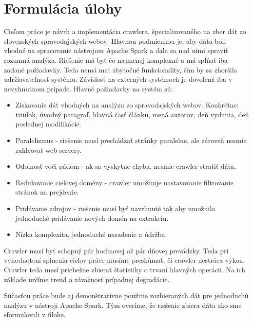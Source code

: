 \chapter*{Formulácia úlohy}


Cieľom práce je návrh a implementácia crawlera, špecializovaného na zber dát zo slovenských spravodajských webov. Hlavnou podmienkou je, aby dáta boli vhodné na spracovanie nástrojom Apache Spark a dala sa nad nimi spraviť rozumná analýza. Riešenie má byť čo najmenej komplexné a má spĺňať iba zadané požiadavky. Teda nemá mať zbytočné funkcionality, čím by sa zhoršila udržiavateľnosť systému. Závislosť na externých systémoch je dovolená iba v nevyhnutnom prípade. Hlavné požiadavky na systém sú: 

\begin{itemize}
    \item Získavanie dát vhodných na analýzu zo spravodajských webov. Konkrétne: titulok, úvodný paragraf, hlavná časť článku, mená autorov, deň vydania, deň poslednej modifikácie.
    \item Paralelizmus - riešenie musí prechádzať stránky paralelne, ale zároveň nesmie zahlcovať web servery.
    \item Odolnosť voči pádom - ak sa vyskytne chyba, nesmie crawler stratiť dáta.
    \item Redukovanie cieľovej domény - crawler umožnuje nastavovanie filtrovanie stránok na prejdenie.
    \item Pridávanie zdrojov - riešenie musí byť navrhnuté tak aby umožnilo jednoduché pridávanie nových domén na extrakciu. 
    \item Nízka komplexita, jednoduché nasadenie a údržba. 
\end{itemize}


Crawler musí byť schopný pár hodinovej až pár dňovej prevádzky. Teda pri vyhodnotení splnenia cieľov práce musíme preskúmať, či crawler nestráca výkon. Crawler teda musí priebežne zbierať štatistiky o trvaní hlavných operácii. Na ich základe určíme trend a závažnosť prípadnej degradácie. 

Súčasťou práce bude aj demonštratívne použitie zozbieraných dát pre jednoduchú analýzu v nástroji Apache Spark. Tým overíme, že riešenie zbiera dáta ako sme sformulovali v úlohe.